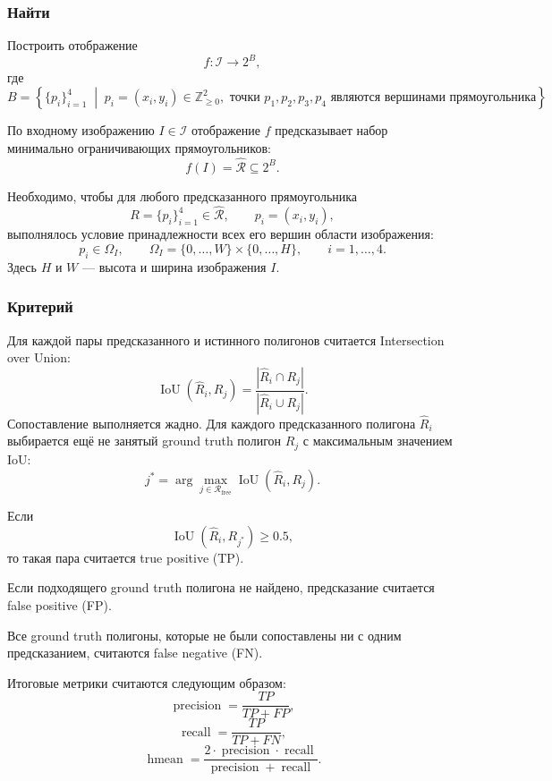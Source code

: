 \documentclass{article}
\begin{document}
\subsubsection{Найти}

Построить отображение
    \[
        f \colon \mathcal{I} \to 2^{B},
    \]
    где
    \[
    B =
    \left\{
    \{p_i\}_{i=1}^{4}
    \;\middle|\;
    p_i=(x_i,y_i)\in \mathbb{Z}_{\ge 0}^{2},
    \text{ точки } p_1,p_2,p_3,p_4
    \text{ являются вершинами прямоугольника}
    \right\}.
    \]
    
    По входному изображению $I \in \mathcal{I}$ отображение $f$ предсказывает набор минимально ограничивающих прямоугольников:
    \[
        f(I) = \hat{\mathcal{R}} \subseteq 2^{B}.
    \]

Необходимо, чтобы для любого предсказанного прямоугольника
    \[
        R = \{p_i\}_{i=1}^{4} \in \hat{\mathcal{R}},
        \qquad p_i=(x_i,y_i),
    \]
    выполнялось условие принадлежности всех его вершин области изображения:
    \[
        p_i \in \Omega_I,
        \qquad
        \Omega_I = \{0,\dots,W\}\times\{0,\dots,H\},
        \qquad i=1,\dots,4.
    \]
    Здесь $H$ и $W$ — высота и ширина изображения $I$.

\subsubsection{Критерий}
Для каждой пары предсказанного и истинного полигонов считается Intersection over Union:
\[
\operatorname{IoU}(\hat{R}_i, R_j)
=
\frac{
    \left|\hat{R}_i \cap R_j\right|
}{
    \left|\hat{R}_i \cup R_j\right|
}.
\]
Сопоставление выполняется жадно. Для каждого предсказанного полигона $\hat{R}_i$
выбирается ещё не занятый ground truth полигон $R_j$ с максимальным значением IoU:
\[
j^*
=
\arg\max_{j \in \mathcal{R}_{\text{free}}}
\operatorname{IoU}(\hat{R}_i, R_j).
\]

Если
\[
\operatorname{IoU}(\hat{R}_i, R_{j^*}) \ge 0.5,
\]
то такая пара считается true positive (TP).

Если подходящего ground truth полигона не найдено, предсказание считается false positive (FP).

Все ground truth полигоны, которые не были сопоставлены ни с одним предсказанием,
считаются false negative (FN).

Итоговые метрики считаются следующим образом:
\[
\operatorname{precision}
=
\frac{TP}{TP + FP},
\]
\[
\operatorname{recall}
=
\frac{TP}{TP + FN},
\]
\[
\operatorname{hmean}
=
\frac{
    2 \cdot \operatorname{precision} \cdot \operatorname{recall}
}{
    \operatorname{precision} + \operatorname{recall}
}.
\]
\end{document}
